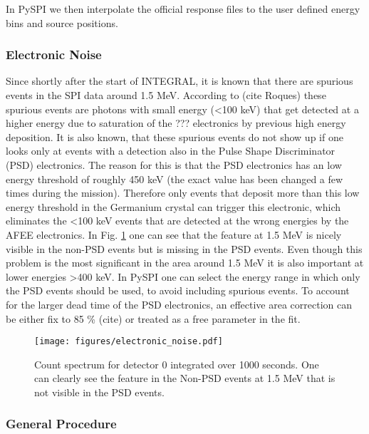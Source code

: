 \documentclass[twocolumn]{aa}
\begin{document}
In PySPI we then interpolate the official response files to the user defined energy bins and source positions.

\subsubsection*{Electronic Noise}

Since shortly after the start of INTEGRAL, it is known that there are spurious events in the SPI data around 1.5 MeV. According to (cite Roques) these spurious events are photons with small energy (<100 keV) that get detected at a higher energy due to saturation of the ??? electronics by previous high energy deposition. It is also known, that these spurious events do not show up if one looks only at events with a detection also in the Pulse Shape Discriminator (PSD) electronics. The reason for this is that the PSD electronics has an low energy threshold of roughly 450 keV (the exact value has been changed a few times during the mission). Therefore only events that deposit more than this low energy threshold in the Germanium crystal can trigger this electronic, which eliminates the <100 keV events that are detected at the wrong energies by the AFEE electronics. In Fig. \ref{fig:electronic} one can see that the feature at 1.5 MeV is nicely visible in the non-PSD events but is missing in the PSD events. Even though this problem is the most significant in the area around 1.5 MeV it is also important at lower energies >400 keV. In PySPI one can select the energy range in which only the PSD events should be used, to avoid including spurious events. To account for the larger dead time of the PSD electronics, an effective area correction can be either fix to 85 \% (cite) or treated as a free parameter in the fit.

\begin{figure}
    \begin{centering}
        \texttt{[image: figures/electronic\_noise.pdf]}
        \caption{Count spectrum for detector 0 integrated over 1000 seconds. One can clearly see the feature in the Non-PSD events at 1.5 MeV that is not visible in the PSD events.}
        \label{fig:electronic}
    \end{centering}
\end{figure}

\subsubsection*{General Procedure}
\end{document}
